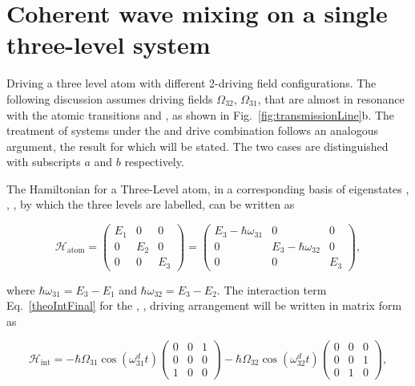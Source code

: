 \section{Coherent wave mixing on a single three-level system}
  Driving a three level atom with different 2-driving field configurations. The following discussion assumes driving fields $ \Omega_{32} $, $ \Omega_{31} $, that are almost in resonance with the atomic transitions \lra{} and \lra{}, as shown in Fig.~\ref{fig:transmissionLine}b. The treatment of systems under the \lra{} and \lra{} drive combination follows an analogous argument, the result for which will be stated. The two cases are distinguished with subscripts $ a $ and $ b $ respectively.
  
  The Hamiltonian for a Three-Level atom, in a corresponding basis of eigenstates , , , by which the three levels are labelled, can be written as
  
  \begin{equation}
  \mathcal{H}_{\text{atom}} = \begin{pmatrix}
  E_1 & 0 & 0\\0& E_2 & 0 \\0&0&E_3
  \end{pmatrix}=\begin{pmatrix}
  E_3-\hbar\omega_{31} & 0 & 0\\0& E_3-\hbar\omega_{32} & 0 \\0&0&E_3
  \end{pmatrix},
  \label{rwaAtomicHamil}
  \end{equation}
  
  \noindent where $ \hbar\omega_{31} = E_3-E_1 $ and $ \hbar\omega_{32} = E_3-E_2$. The interaction term Eq.~\eqref{theoIntFinal} for the \lra{}, \lra{}, driving arrangement will be written in matrix form as
  
  \begin{equation}
  \mathcal{H}_{\text{int}} = -\hbar\Omega_{31}\cos(\omega_{31}^{d}t) \begin{pmatrix}
  0 & 0 & 1\\0&0&0\\1&0&0
  \end{pmatrix}-\hbar\Omega_{32}\cos(\omega_{32}^{d}t) \begin{pmatrix}
  0 & 0 & 0\\0&0&1\\0&1&0
  \end{pmatrix},
  \label{rwaDriveHamiltonian}
  \end{equation}
  
